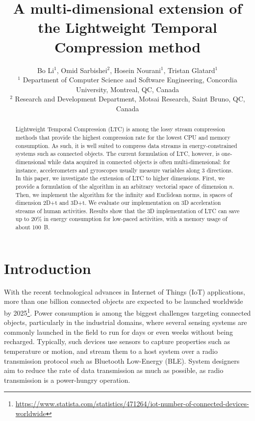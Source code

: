 \documentclass[10pt, conference, compsocconf]{IEEEtran}
\begin{document}
\title{A multi-dimensional extension of the Lightweight Temporal Compression method}

\author{Bo Li$^1$, Omid Sarbishei$^2$, Hosein Nourani$^1$, Tristan Glatard$^1$\\
  $^1$ Department of Computer Science and Software Engineering, Concordia University, Montreal, QC, Canada \\
  $^2$  Research and Development Department, Motsai Research, Saint Bruno, QC, Canada \vspace*{0.9cm}}
\maketitle

\begin{abstract}
Lightweight Temporal Compression
(LTC) is among the lossy stream
compression methods that provide the highest compression rate for the 
lowest CPU and memory consumption. As such, it is well suited to 
compress data streams in energy-constrained systems such as connected 
objects. The current formulation of LTC, however, is one-dimensional 
while data acquired in connected objects is often multi-dimensional: for instance, 
accelerometers and gyroscopes usually measure variables along 
3 directions. In this 
paper, we investigate the extension of LTC to 
higher dimensions. First, we provide a formulation 
of the algorithm in an arbitrary vectorial space of dimension $n$. 
Then, we implement the algorithm for the infinity and Euclidean norms, 
in spaces of dimension 2D+t and 3D+t. We evaluate our implementation on 
3D acceleration streams of human activities. 
Results show that the 3D implementation of LTC can save up to 20\% in 
energy consumption for low-paced activities, with a memory usage of about 100~B.
\end{abstract}

\section{Introduction}

With the recent technological advances in Internet of Things (IoT) 
applications, more than one billion connected objects are expected to 
be launched worldwide by 2025\footnote{\url{ 
https://www.statista.com/statistics/471264/iot-number-of-connected-devices-worldwide}}.
Power consumption is among the biggest challenges targeting connected 
objects, particularly in the industrial domains, where several sensing 
systems are commonly launched in the field to run for days or even 
weeks without being recharged. Typically, such devices use sensors to 
capture properties such as temperature or motion, and stream them to a 
host system over a radio transmission protocol such as Bluetooth 
Low-Energy (BLE). System designers aim to reduce the rate of data 
transmission as much as possible, as radio transmission is a 
power-hungry operation.
\end{document}
